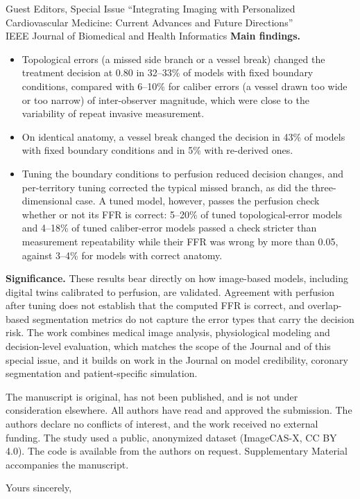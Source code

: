 \documentclass[10pt]{letter}
\begin{document}
\begin{letter}{Guest Editors, Special Issue ``Integrating Imaging with Personalized Cardiovascular Medicine: Current
Advances and Future Directions''\\IEEE Journal of Biomedical and Health Informatics}
\textbf{Main findings.}
\begin{itemize}
\item Topological errors (a missed side branch or a vessel break) changed the treatment decision at 0.80 in 32--33\%
of models with fixed boundary conditions, compared with 6--10\% for caliber errors (a vessel drawn too wide or too narrow) of inter-observer magnitude, which
were close to the variability of repeat invasive measurement.
\item On identical anatomy, a vessel break changed the decision in 43\% of models with fixed boundary conditions and
in 5\% with re-derived ones.
\item Tuning the boundary conditions to perfusion reduced decision changes, and per-territory tuning corrected the
typical missed branch, as did the three-dimensional case. A tuned model, however, passes the perfusion check whether
or not its FFR is correct: 5--20\% of tuned topological-error models and 4--18\% of tuned caliber-error models passed
a check stricter than measurement repeatability while their FFR was wrong by more than 0.05, against 3--4\% for
models with correct anatomy.
\end{itemize}

\textbf{Significance.} These results bear directly on how image-based models, including digital twins calibrated to
perfusion, are validated. Agreement with
perfusion after tuning does not establish that the computed FFR is correct, and overlap-based segmentation metrics do not capture the error types that
carry the decision risk. The work combines medical image analysis, physiological modeling and decision-level
evaluation, which matches the scope of the Journal and of this special issue, and it builds on work in the Journal on
model credibility, coronary segmentation and patient-specific simulation. 

The manuscript is original, has not been published, and is not under consideration elsewhere. All authors have read
and approved the submission. The authors declare no conflicts of interest, and the work received no external funding.
The study used a public, anonymized dataset (ImageCAS-X, CC BY 4.0). The code is available from the authors on request. Supplementary Material accompanies the manuscript.

\closing{Yours sincerely,}
\end{letter}
\end{document}
